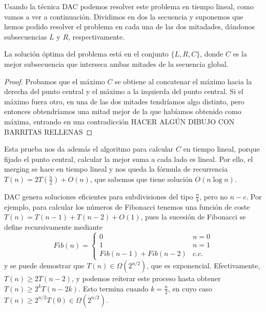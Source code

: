 \documentclass[AL.tex]{subfiles}
\begin{document}
\begin{ejs}
\begin{enumerate}
Usando la técnica DAC podemos resolver este problema en tiempo lineal, como vamos a ver a continuación. Dividimos en dos la secuencia y suponemos que hemos podido resolver el problema en cada una de las dos mitadades, dándonos subsecuencias $L$ y $R$, respectivamente. 
\begin{lemma}
La solución óptima del problema está en el conjunto $\{L,R,C\}$, donde $C$ es la mejor subsecuencia que interseca ambas mitades de la secuencia global. 
\end{lemma}
\begin{proof}
Probamos que el máximo $C$ se obtiene al concatenar el máximo hacia la derecha del punto central y el máximo a la izquierda del punto central. Si el máximo fuera otro, en una de las dos mitades tendríamos algo distinto, pero entonces obtendríamos una mitad mejor de la que habíamos obtenido como máxima, entrando en una contradicción HACER ALGÚN DIBUJO CON BARRITAS RELLENAS
\end{proof}
Esta prueba nos da además el algoritmo para calcular $C$ en tiempo lineal, porque fijado el punto central, calcular la mejor suma a cada lado es lineal. Por ello, el merging se hace en tiempo lineal y nos queda la fórmula de recurrencia $T(n)=2T\left(\frac{n}{2}\right)+O(n)$, que sabemos que tiene solución $O(n\log n)$. 
\end{enumerate}
\end{ejs}
\begin{nota}
DAC genera soluciones eficientes para subdivisiones del tipo $\frac{n}{b}$, pero no $n-c$. Por ejemplo, para calcular los números de Fibonacci tenemos una función de coste $T(n)=T(n-1)+T(n-2)+O(1)$, pues la sucesión de Fibonacci se define recursivamente mediante
\[
Fib(n)=\begin{cases}
0 & n=0\\
1 & n=1\\
Fib(n-1)+Fib(n-2) & c.c.
\end{cases}
\]
y se puede demostrar que $T(n)\in\Omega(2^{n/2})$, que es exponencial. Efectivamente, $T(n)\geq 2T(n-2)$, y podemos reiterar este proceso hasta obtener $T(n)\geq 2^kT(n-2k)$. Esto termina cuando $k=\frac{n}{2}$, en cuyo caso $T(n)\geq 2^{n/2}T(0)\in\Omega(2^{n/2})$. 
\end{nota}
\end{document}
